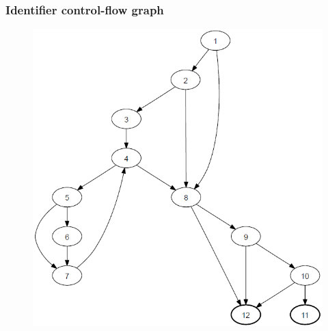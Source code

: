 \begin{frame}[hasprev=false ,hasnext=false, c]
\label{example:identifier-cfg}
\frametitle{Identifier control-flow graph}

\begin{figure}
	\centering
	\includegraphics[scale=.3]{aux/examples/identifier-cfg/identifier-java-cfg}
\end{figure}
\end{frame}